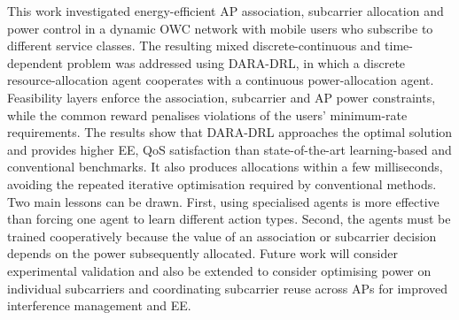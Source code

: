 \documentclass[journal]{IEEEtran}
\begin{document}
This work investigated energy-efficient AP association, subcarrier allocation and power control in a dynamic OWC network with mobile users who subscribe to different service classes. The resulting mixed discrete-continuous and time-dependent problem was addressed using DARA-DRL, in which a discrete resource-allocation agent cooperates with a continuous power-allocation agent. Feasibility
layers enforce the association, subcarrier and AP power
constraints, while the common reward penalises violations
of the users' minimum-rate requirements. The results show that DARA-DRL approaches the optimal solution and provides higher EE, QoS satisfaction than state-of-the-art learning-based and conventional benchmarks. It also produces allocations within a few milliseconds, avoiding the repeated iterative optimisation required by conventional methods. Two main lessons can be drawn. First, using specialised agents is more effective than forcing one agent to learn different action types. Second, the agents must be trained cooperatively because the value of an association or subcarrier decision depends on the power subsequently allocated. Future work will consider experimental validation and also be extended to consider optimising power on individual subcarriers and coordinating subcarrier reuse across APs for improved interference management and EE.



\end{document}
